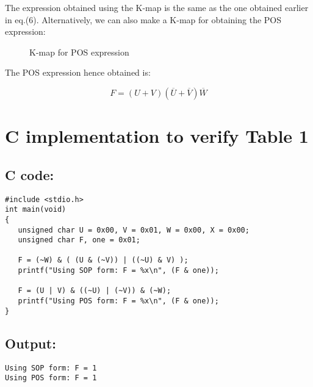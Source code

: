 \documentclass{article}
\begin{document}
The expression obtained using the K-map is the same as the one obtained earlier in eq.(6). Alternatively, we can also make a K-map for obtaining the POS expression:

\begin{figure}[h]
\centering

\caption{K-map for POS expression}
\label{kmap_POS}
\end{figure}

The POS expression hence obtained is:

\begin{equation}
    F = (U+V)(\overline{U}+\overline{V})\overline{W}
\end{equation}

\section{C implementation to verify Table 1}
\subsection{C code:}
\begin{lstlisting}[style=CStyle]
#include <stdio.h>
int main(void)
{
   unsigned char U = 0x00, V = 0x01, W = 0x00, X = 0x00;
   unsigned char F, one = 0x01;
   
   F = (~W) & ( (U & (~V)) | ((~U) & V) );
   printf("Using SOP form: F = %x\n", (F & one));
   
   F = (U | V) & ((~U) | (~V)) & (~W);
   printf("Using POS form: F = %x\n", (F & one));
}
\end{lstlisting}
\subsection{Output:}
\begin{lstlisting}[style=CStyle]
Using SOP form: F = 1
Using POS form: F = 1
\end{lstlisting}

\hline
\end{document}
